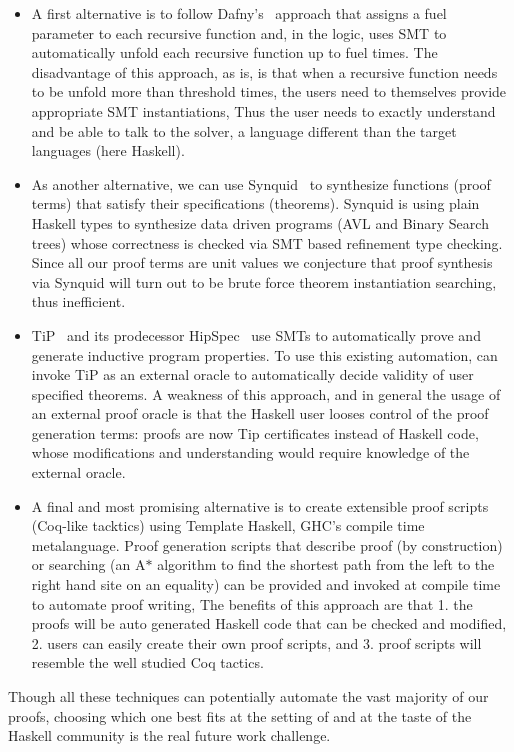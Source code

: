 \begin{itemize}
\item A first alternative is to follow Dafny's~\cite{dafny} approach
that assigns a fuel parameter to each recursive function and, 
in the logic, uses SMT to automatically unfold each recursive function up to fuel times. 
%
The disadvantage of this approach, as is, is that when 
a recursive function needs to be unfold more than threshold times, 
the users need to themselves provide appropriate SMT instantiations, 
Thus the user needs to exactly understand and be able to talk to the solver, 
a language different than the target languages (here Haskell).

\item As another alternative, we can use Synquid~\cite{polikarpova16}
to synthesize functions (\ie proof terms) that satisfy their specifications 
(\ie theorems). 
%
Synquid is using plain Haskell types to synthesize
data driven programs (\eg AVL and Binary Search trees)
whose correctness is checked via SMT based refinement type checking. 
%
Since all our proof terms are unit values 
we conjecture that proof synthesis via Synquid 
will turn out to be brute force theorem instantiation searching, 
thus inefficient. 
\item 
TiP~\cite{tip} and its prodecessor HipSpec~\cite{hipspec}
use SMTs to automatically prove and generate inductive program properties. 
%
To use this existing automation, \toolname can invoke TiP
as an external oracle to automatically decide validity of user specified theorems. 
%
A weakness of this approach, and in general the usage of an external proof oracle 
is that the Haskell user looses control of the proof generation terms: 
proofs are now Tip certificates instead of Haskell code, 
whose modifications and understanding would require knowledge of the external oracle.  

\item
A final and most promising alternative is to create extensible proof scripts (Coq-like tacktics)
using Template Haskell, GHC's compile time metalanguage. 
%
Proof generation scripts 
that describe proof (\ie by construction) or searching 
(\ie an A$*$ algorithm to find the shortest path from the left to the right hand site on an equality) 
can be provided and invoked at compile time to automate proof writing, 
%
The benefits of this approach are that 
1. the proofs will be auto generated Haskell code that can be checked and modified, 
2. users can easily create their own proof scripts, and 
3. proof scripts will resemble the well studied Coq tactics. 
\end{itemize}
% 
Though all these techniques can potentially automate the vast majority of 
our proofs, choosing which one best fits at the setting of \toolname and 
at the taste of the Haskell community is the real future work challenge.





